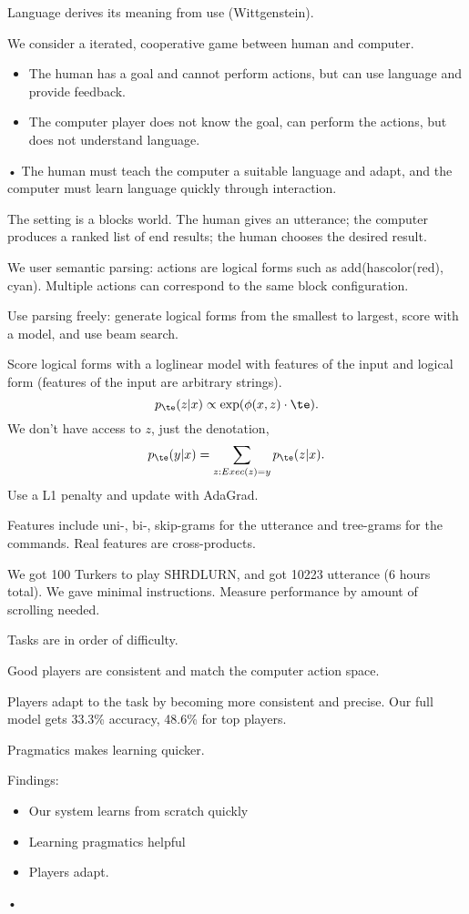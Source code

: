 Language derives its meaning from use (Wittgenstein). 

We consider a iterated, cooperative game between human and computer. 
\begin{itemize}
\item
The human has a goal and cannot perform actions, but can use language and provide feedback. 
\item
The computer player does not know the goal, can perform the actions, but does not understand language. 
\end{itemize}•
The human must teach the computer a suitable language and adapt, and the computer must  learn language quickly through interaction. 

The setting is a blocks world.  The human gives an utterance; the computer produces a ranked list of end results; the human chooses the desired result.

We user semantic parsing: actions are logical forms such as add(hascolor(red), cyan). Multiple actions can correspond to the same block configuration.

Use parsing freely: generate logical forms from the smallest to largest, score with a model, and use beam search.

Score logical forms with a loglinear model with features of the input and logical form (features of the input are arbitrary strings).
$$
p_\te(z|x)\propto \exp(\phi(x,z)\cdot \te).
$$
We don't have access to $z$, just the denotation, 
$$
p_\te(y|x) = \sum_{z:Exec(z)=y}p_\te(z|x).
$$
Use a L1 penalty and update with AdaGrad.

Features include uni-, bi-, skip-grams for the utterance and tree-grams for the commands.
Real features are cross-products.

We got 100 Turkers to play SHRDLURN, and got 10223 utterance (6 hours total). We gave minimal instructions. Measure performance by amount of scrolling needed.

Tasks are in order of difficulty.

Good players are consistent and match the computer action space.

Players adapt to the task by becoming more consistent and precise. Our full model gets 33.3\% accuracy, 48.6\% for top players. 

Pragmatics makes learning quicker.


Findings:
\begin{itemize}
\item
Our system learns from scratch quickly
\item
Learning pragmatics helpful
\item
Players adapt.
\end{itemize}•


